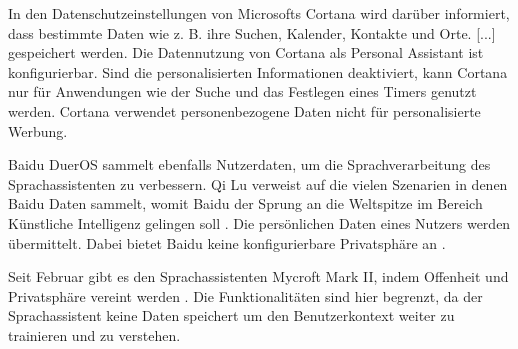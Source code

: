 In den Datenschutzeinstellungen von Microsofts Cortana wird darüber informiert, dass bestimmte Daten \glqq [...] wie z. B. ihre Suchen, Kalender, Kontakte und Orte. [...]\grqq{}\cite{cortanaAssistent} gespeichert werden. Die Datennutzung von Cortana als Personal Assistant ist konfigurierbar. Sind die personalisierten Informationen deaktiviert, kann Cortana nur für Anwendungen wie der Suche und das Festlegen eines Timers genutzt werden. Cortana verwendet personenbezogene Daten nicht für personalisierte Werbung. 

Baidu DuerOS sammelt ebenfalls Nutzerdaten, um die Sprachverarbeitung des Sprachassistenten zu verbessern. Qi Lu verweist auf die vielen Szenarien in denen Baidu Daten sammelt, womit Baidu der Sprung an die Weltspitze im Bereich Künstliche Intelligenz gelingen soll . Die persönlichen Daten eines Nutzers werden übermittelt. Dabei bietet Baidu keine konfigurierbare Privatsphäre an \cite{baiduAI}. 

Seit Februar gibt es den Sprachassistenten Mycroft Mark II, indem Offenheit und Privatsphäre vereint werden \cite{mycroftsmartspeaker}. Die Funktionalitäten sind hier begrenzt, da der Sprachassistent keine Daten speichert um den Benutzerkontext weiter zu trainieren und zu verstehen.